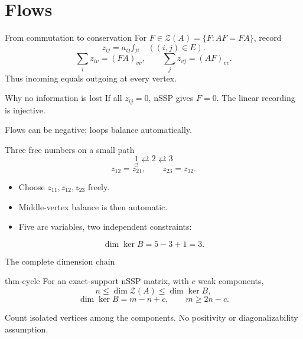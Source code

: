 \documentclass{beamer}
\begin{document}
\section{Flows}
\begin{frame}{From commutation to conservation}
For $F\in\mathcal Z(A)=\{F:AF=FA\}$, record
\[
 z_{ij}=a_{ij}f_{ji}\quad ((i,j)\in E).
\]
\[
 \sum_i z_{iv}=(FA)_{vv},\qquad
 \sum_j z_{vj}=(AF)_{vv}.
\]
Thus incoming equals outgoing at every vertex.
\begin{block}{Why no information is lost}
If all $z_{ij}=0$, nSSP gives $F=0$. The linear recording is injective.
\end{block}
\small Flows can be negative; loops balance automatically.
\end{frame}
\begin{frame}{Three free numbers on a small path}
\[
 \underset{\circlearrowleft}{1}\rightleftarrows2\rightleftarrows3
\]
\[
 z_{12}=z_{21},\qquad z_{23}=z_{32}.
\]
\begin{itemize}
\item Choose $z_{11},z_{12},z_{23}$ freely.
\item Middle-vertex balance is then automatic.
\item Five arc variables, two independent constraints:
\end{itemize}
\[
 \dim\ker B=5-3+1=3.
\]
\end{frame}
\begin{frame}{The complete dimension chain}
\begin{bookresult}{thm-cycle}
For an exact-support nSSP matrix, with $c$ weak components,
\[
 n\leq\dim\mathcal Z(A)\leq\dim\ker B,
\]
\[
 \dim\ker B=m-n+c,\qquad m\geq2n-c.
\]
\end{bookresult}
\small Count isolated vertices among the components. No positivity or diagonalizability assumption.
\end{frame}
\end{document}
